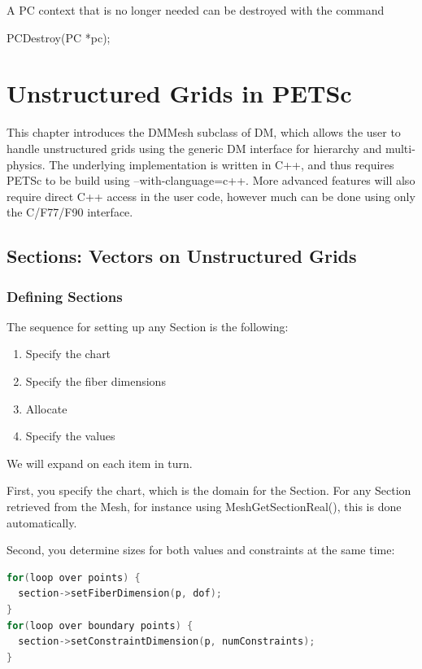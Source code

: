 {{{A PC context that is no longer needed can be destroyed with the 
command
\begin{tabbing}
  PCDestroy(PC *pc);
\end{tabbing}


\cleardoublepage
\chapter{Unstructured Grids in PETSc}
\label{ch_unstructured}

This chapter introduces the DMMesh subclass of DM, which allows the user to handle unstructured grids using the generic
DM interface for hierarchy and multi-physics. The underlying implementation is written in C++, and thus requires PETSc
to be build using --with-clanguage=c++. More advanced features will also require direct C++ access in the user code,
however much can be done using only the C/F77/F90 interface.

\medskip \medskip

\section{Sections: Vectors on Unstructured Grids} 

\subsection{Defining Sections}

The sequence for setting up any Section is the following:
\begin{enumerate}
  \item Specify the chart
  \item Specify the fiber dimensions
  \item Allocate
  \item Specify the values
\end{enumerate}
We will expand on each item in turn.

First, you specify the chart, which is the domain for the Section. For any Section retrieved from the Mesh, for instance
using MeshGetSectionReal(), this is done automatically.

Second, you determine sizes for both values and constraints at the same time:
\begin{lstlisting}[language=C++]
for(loop over points) {
  section->setFiberDimension(p, dof);
}
for(loop over boundary points) {
  section->setConstraintDimension(p, numConstraints);
}
\end{lstlisting}

}}}
